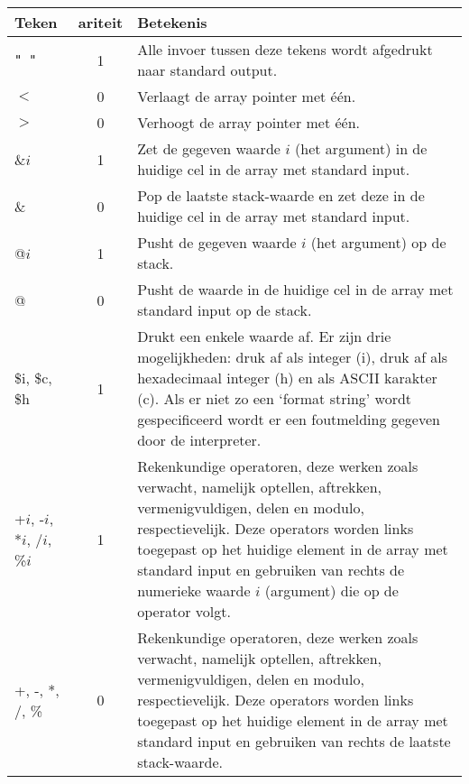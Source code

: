 \documentclass[11pt]{article}
\begin{document}
\begin{center}
    \begin{tabular}{ | l | c | p{12cm} | }
    \hline
    Teken                                   & ariteit & Betekenis \\ \hline
    \verb|" "| & 1                          & Alle invoer tussen deze tekens wordt afgedrukt naar standard output. \\ \hline
    \(<\)                                   & 0 & Verlaagt de array pointer met \'e\'en. \\ \hline
    \(>\)                                   & 0 & Verhoogt de array pointer met \'e\'en. \\ \hline
    \&\(i\)                                 & 1 & Zet de gegeven waarde \(i\) (het argument) in de huidige cel in de array met standard input. \\ \hline
    \&                                      & 0 & Pop de laatste stack-waarde en zet deze in de huidige cel in de array met standard input. \\ \hline
    @\(i\)                                  & 1 & Pusht de gegeven waarde \(i\) (het argument) op de stack. \\ \hline
    @                                       & 0 & Pusht de waarde in de huidige cel in de array met standard input op de stack. \\ \hline
    \$i, \$c, \$h                           & 1 & Drukt een enkele waarde af. Er zijn drie mogelijkheden: druk af als integer (i), druk af als hexadecimaal integer (h) en als ASCII karakter (c). Als er niet zo een `format string' wordt gespecificeerd wordt er een foutmelding gegeven door de interpreter. \\ \hline %
    +\(i\), -\(i\), *\(i\), /\(i\), \%\(i\) & 1 & Rekenkundige operatoren, deze werken zoals verwacht, namelijk optellen, aftrekken, vermenigvuldigen, delen en modulo, respectievelijk. Deze operators worden links toegepast op het huidige element in de array met standard input en gebruiken van rechts de numerieke waarde \(i\) (argument) die op de operator volgt. \\ \hline
    +, -, *, /, \%                          & 0 & Rekenkundige operatoren, deze werken zoals verwacht, namelijk optellen, aftrekken, vermenigvuldigen, delen en modulo, respectievelijk. Deze operators worden links toegepast op het huidige element in de array met standard input en gebruiken van rechts de laatste stack-waarde. \\ \hline

\end{tabular}
\end{center}
\end{document}
